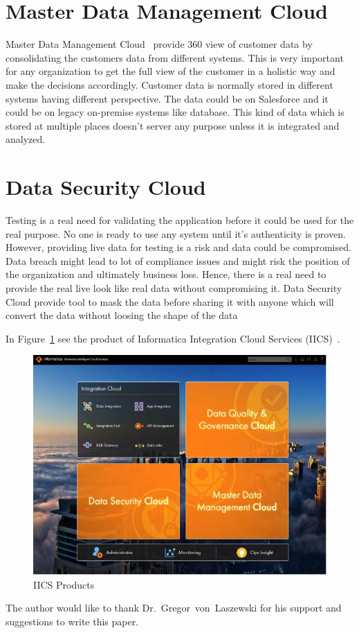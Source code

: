 \section{Master Data Management Cloud}
Master Data Management Cloud~\cite{hid-sp18-511-iics} provide 360 view
of customer data by consolidating the customers data from different
systems. This is very important for any organization to get the full view of the customer in a holistic way and make the decisions accordingly. Customer data is normally stored in different systems having different perspective. The data could be on Salesforce\cite{hid-sp18-511-salesforce} and it could be on legacy on-premise systems like database. This kind of data which is stored at multiple places doesn't server any purpose unless it is integrated and analyzed.

\section{Data Security Cloud}
Testing is a real need for validating the application before it could be used for the real purpose. No one is ready to use any system until it's authenticity is proven. However, providing
live data for testing is a risk and data could be
compromised. Data breach might lead to lot of compliance issues and might risk the position of the organization and ultimately business loss. Hence, there is a real need to provide the real live look like real data without compromising it. Data Security Cloud\cite{hid-sp18-511-iics}
provide tool to mask the data before sharing it with anyone which
will convert the data without loosing the shape of the data

In Figure~\ref{f:iics-products}\cite{hid-sp18-511-iics} see the
product of Informatica Integration Cloud Services
(IICS)~\cite{hid-sp18-511-iics}.


\begin{figure}[!ht]
	\centering\includegraphics[width=\columnwidth]{images/IICS-0.jpg}
	\caption{IICS Products}\label{f:iics-products}
\end{figure}

\begin{acks}

The author would like to thank Dr.~Gregor~von~Laszewski for his
support and suggestions to write this paper.

\end{acks}


 

